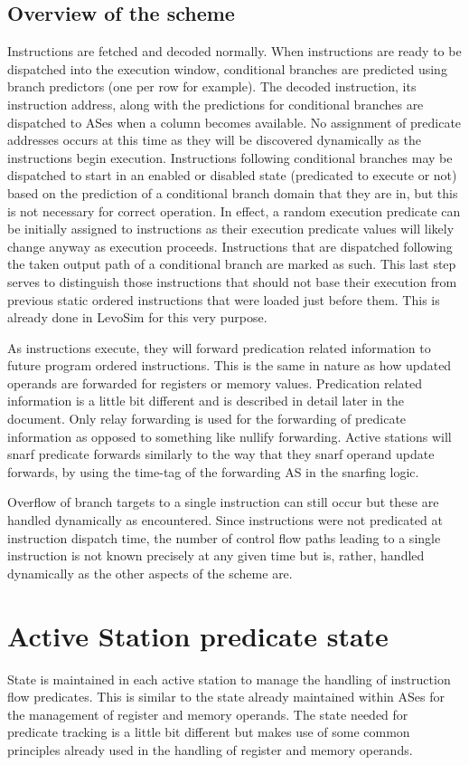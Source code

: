 \documentclass[10pt,dvips]{article}
\begin{document}
\subsection{Overview of the scheme}
%
Instructions are fetched and decoded normally.  When instructions are
ready to be dispatched into the execution window, conditional branches are
predicted using branch predictors (one per row for example).  The
decoded instruction, its instruction address, along with 
the predictions for conditional branches
are dispatched to ASes when a column becomes available.  No assignment of
predicate addresses occurs at this time as they will be discovered
dynamically as the instructions begin execution.  Instructions
following conditional branches may be dispatched to start in an enabled or
disabled state (predicated to execute or not) based on the prediction
of a conditional branch domain that they are in, but this is not
necessary for correct operation.  In effect, a random execution
predicate can be initially assigned to instructions as their execution
predicate
values will likely change anyway as execution proceeds.
Instructions that are dispatched following the taken output path
of a conditional branch are marked as such.
This last step serves to distinguish those
instructions that should not base their execution from previous
static ordered instructions that were loaded just before them.
This is already done in LevoSim for this very purpose.

As instructions execute, they will forward predication related
information to future program ordered instructions.
This is the same in nature as how updated operands are forwarded
for registers or memory values.  Predication related
information is a little bit different and is described in
detail later in the document.  Only relay forwarding is used
for the forwarding of predicate information as opposed to something
like nullify forwarding.  Active stations will snarf predicate forwards
similarly to the way that they snarf operand update forwards, by
using the time-tag of the forwarding AS in the snarfing logic.

Overflow of branch targets to a single instruction can still occur
but these are handled dynamically as encountered.
Since instructions were not
predicated at instruction dispatch time, the number of control
flow paths leading to a single instruction is not known
precisely at any given time
but is, rather, handled dynamically as the other aspects
of the scheme are.
%
\section{Active Station predicate state}
%
State is maintained in each active station to manage
the handling of instruction flow predicates.
This is similar to the state already maintained within ASes
for the management of register and memory operands.
The state needed for predicate tracking is a little bit
different but makes use of some common principles already used
in the handling of register and memory operands.
\end{document}
